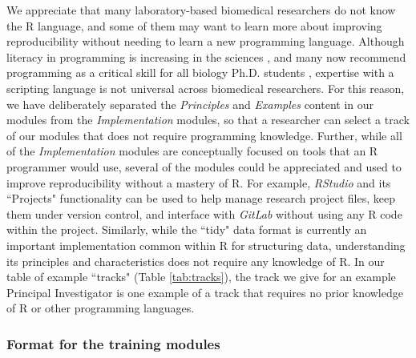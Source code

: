 \documentclass[pdftex,english,11pt,parskip=half]{scrartcl}
\begin{document}
We appreciate that many laboratory-based biomedical researchers do not know the R language, and
some of them may want to learn more about improving reproducibility without
needing to learn a new programming language. 
Although literacy in programming is increasing in the sciences
\cite{ram2013git}, and many now recommend programming as a critical skill for
all biology Ph.D. students \cite{list2017ten}, expertise
with a scripting language is not universal across biomedical researchers. For this reason, we have
deliberately separated the \textit{Principles} and \textit{Examples} content in our modules
from the \textit{Implementation} modules, so that a researcher can select a track of
our modules that does not require programming knowledge. Further, while all of
the \textit{Implementation} modules are conceptually focused on tools that an R
programmer would use, several of the modules could be appreciated and used to
improve reproducibility without a mastery of R. For example, \textit{RStudio} and its
``Projects" functionality can be used to help manage research project files,
keep them under version control, and interface with \textit{GitLab} without using any R code within the project. Similarly, while
the ``tidy" data format is currently an important implementation common within R
for structuring data, understanding its principles and characteristics does not
require any knowledge of R. In our table of example ``tracks" (Table \ref{tab:tracks}), the track we give for an example Principal Investigator is one example
of a track that requires no prior knowledge of R or other programming
languages.   







\subsubsection*{Format for the training modules}
\end{document}
